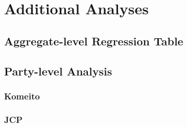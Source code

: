 \documentclass[a4paper, 11pt]{article}
\begin{document}
\newpage

\section{Additional Analyses}

\subsection{Aggregate-level Regression Table}



\newpage

\subsection{Party-level Analysis}

\subsubsection*{Komeito}



\newpage

\subsubsection*{JCP}


\end{document}
